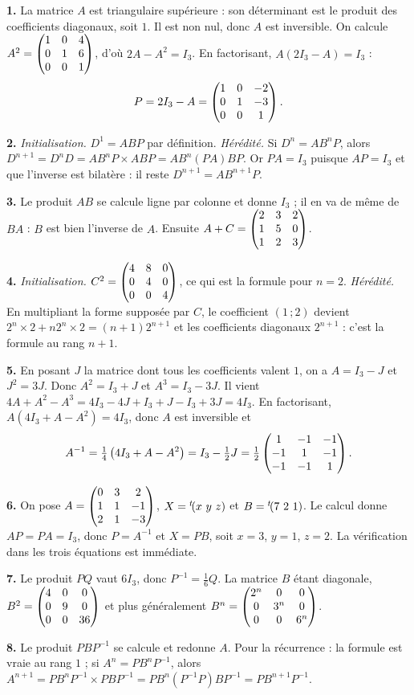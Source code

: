 \begin{corrige}[annales]
\textbf{1.} La matrice $A$ est triangulaire supérieure : son déterminant est
le produit des coefficients diagonaux, soit $1$. Il est non nul, donc $A$ est
inversible. On calcule $A^{2} = \begin{pmatrix} 1 & 0 & 4 \\ 0 & 1 & 6 \\ 0 & 0 & 1 \end{pmatrix}$, d'où
$2A-A^{2} = I_{3}$. En factorisant, $A\left(2I_{3}-A\right) = I_{3}$ :
\[
  P = 2I_{3}-A = \begin{pmatrix} 1 & 0 & -2 \\ 0 & 1 & -3 \\ 0 & 0 & 1 \end{pmatrix}.
\]

\textbf{2.} \emph{Initialisation.} $D^{1} = ABP$ par définition.
\emph{Hérédité.} Si $D^{n} = AB^{n}P$, alors
$D^{n+1} = D^{n}D = AB^{n}P \times ABP = AB^{n}\left(PA\right)BP$. Or
$PA = I_{3}$ puisque $AP = I_{3}$ et que l'inverse est bilatère : il reste
$D^{n+1} = AB^{n+1}P$.

\textbf{3.} Le produit $AB$ se calcule ligne par colonne et donne $I_{3}$ ; il
en va de même de $BA$ : $B$ est bien l'inverse de $A$. Ensuite
$A+C = \begin{pmatrix} 2 & 3 & 2 \\ 1 & 5 & 0 \\ 1 & 2 & 3 \end{pmatrix}$.

\textbf{4.} \emph{Initialisation.} $C^{2} = \begin{pmatrix} 4 & 8 & 0 \\ 0 & 4 & 0 \\ 0 & 0 & 4 \end{pmatrix}$,
ce qui est la formule pour $n = 2$. \emph{Hérédité.} En multipliant la forme
supposée par $C$, le coefficient $(1\,;2)$ devient
$2^{n}\times2+n2^{n}\times2 = (n+1)2^{n+1}$ et les coefficients diagonaux
$2^{n+1}$ : c'est la formule au rang $n+1$.

\textbf{5.} En posant $J$ la matrice dont tous les coefficients valent $1$, on
a $A = I_{3}-J$ et $J^{2} = 3J$. Donc
$A^{2} = I_{3}+J$ et $A^{3} = I_{3}-3J$. Il vient
$4A+A^{2}-A^{3} = 4I_{3}-4J+I_{3}+J-I_{3}+3J = 4I_{3}$. En factorisant,
$A\left(4I_{3}+A-A^{2}\right) = 4I_{3}$, donc $A$ est inversible et
\[
  A^{-1} = \tfrac14\left(4I_{3}+A-A^{2}\right) = I_{3}-\tfrac12 J
  = \tfrac12\begin{pmatrix} 1 & -1 & -1 \\ -1 & 1 & -1 \\ -1 & -1 & 1 \end{pmatrix}.
\]

\textbf{6.} On pose $A = \begin{pmatrix} 0 & 3 & 2 \\ 1 & 1 & -1 \\ 2 & 1 & -3 \end{pmatrix}$,
$X = {}^{t}\!(x\ y\ z)$ et $B = {}^{t}\!(7\ 2\ 1)$. Le calcul donne
$AP = PA = I_{3}$, donc $P = A^{-1}$ et $X = PB$, soit $x = 3$, $y = 1$,
$z = 2$. La vérification dans les trois équations est immédiate.

\textbf{7.} Le produit $PQ$ vaut $6I_{3}$, donc $P^{-1} = \frac16 Q$. La
matrice $B$ étant diagonale, $B^{2} = \begin{pmatrix} 4 & 0 & 0 \\ 0 & 9 & 0 \\ 0 & 0 & 36 \end{pmatrix}$
et plus généralement
$B^{n} = \begin{pmatrix} 2^{n} & 0 & 0 \\ 0 & 3^{n} & 0 \\ 0 & 0 & 6^{n} \end{pmatrix}$.

\textbf{8.} Le produit $PBP^{-1}$ se calcule et redonne $A$. Pour la
récurrence : la formule est vraie au rang $1$ ; si $A^{n} = PB^{n}P^{-1}$,
alors
$A^{n+1} = PB^{n}P^{-1}\times PBP^{-1} = PB^{n}\left(P^{-1}P\right)BP^{-1}
= PB^{n+1}P^{-1}$.
\end{corrige}

